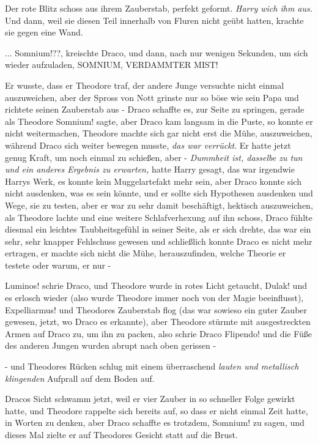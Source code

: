 Der rote Blitz schoss aus ihrem Zauberstab, perfekt geformt. \emph{Harry wich
ihm aus.} Und dann, weil sie diesen Teil innerhalb von Fluren nicht geübt
hatten, krachte sie gegen eine Wand.

... \glqq{}Somnium!??\grqq{}, kreischte Draco, und dann, nach nur wenigen
Sekunden, um sich wieder aufzuladen, \glqq{}SOMNIUM, VERDAMMTER MIST!\grqq{}

Er wusste, dass er Theodore traf, der andere Junge versuchte nicht einmal
auszuweichen, aber der Spross von Nott grinste nur so böse wie sein Papa und
richtete seinen Zauberstab aus - Draco schaffte es, zur Seite zu springen,
gerade als Theodore \glqq{}Somnium!\grqq{} sagte, aber Draco kam langsam in die
Puste, so konnte er nicht weitermachen, Theodore machte sich gar nicht erst die
Mühe, auszuweichen, während Draco sich weiter bewegen musste, \emph{das war
verrückt}. Er hatte jetzt genug Kraft, um noch einmal zu schießen, aber -
\emph{Dummheit ist, dasselbe zu tun und ein anderes Ergebnis zu erwarten,} hatte
Harry gesagt, das war irgendwie Harrys Werk, es konnte kein Muggelartefakt mehr
sein, aber Draco konnte sich nicht ausdenken, was es sein könnte, und er sollte
sich Hypothesen ausdenken und Wege, sie zu testen, aber er war zu sehr damit
beschäftigt, hektisch auszuweichen, als Theodore lachte und eine weitere
Schlafverhexung auf ihn schoss, Draco fühlte diesmal ein leichtes
Taubheitsgefühl in seiner Seite, als er sich drehte, das war ein sehr, sehr
knapper Fehlschuss gewesen und schließlich konnte Draco es nicht mehr ertragen,
er machte sich nicht die Mühe, herauszufinden, welche Theorie er testete oder
warum, er nur -

\glqq{}Luminos!\grqq{} schrie Draco, und Theodore wurde in rotes Licht getaucht,
\glqq{}Dulak!\grqq{} und es erlosch wieder (also wurde Theodore immer noch von
der Magie beeinflusst), \glqq{}Expelliarmus!\grqq{} und Theodores Zauberstab flog
(das war sowieso ein guter Zauber gewesen, jetzt, wo Draco es erkannte), aber
Theodore stürmte mit ausgestreckten Armen auf Draco zu, um ihn zu packen, also
schrie Draco \glqq{}Flipendo!\grqq{} und die Füße des anderen Jungen wurden
abrupt nach oben gerissen -

- und Theodores Rücken schlug mit einem überraschend \emph{lauten und metallisch
klingenden} Aufprall auf dem Boden auf.

Dracos Sicht schwamm jetzt, weil er vier Zauber in so schneller Folge gewirkt
hatte, und Theodore rappelte sich bereits auf, so dass er nicht einmal Zeit
hatte, in Worten zu denken, aber Draco schaffte es trotzdem, \glqq{}
Somnium!\grqq{} zu sagen, und dieses Mal zielte er auf Theodores Gesicht statt
auf die Brust.

